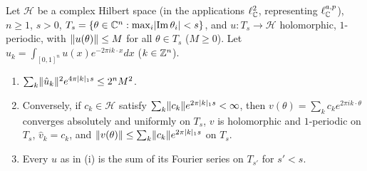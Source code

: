 \begin{lemma}\label{bpW:w1:fourier-l2}
Let $\mathcal H$ be a complex Hilbert space (in the applications $\ell^2_{\mathbb{C}}$, representing $\ell^{a,p}_{\mathbb{C}}$), $n\ge1$,
$s>0$, $T_s=\{\theta\in\mathbb{C}^n:\max_i\lvert \operatorname{Im}\theta_i\rvert<s\}$, and $u:T_s\to\mathcal H$ holomorphic, $1$-periodic,
with $\lVert u(\theta)\rVert\le M$ for all $\theta\in T_s$ ($M\ge0$). Let $\hat u_k=\int_{[0,1]^n}u(x)e^{-2\pi ik\cdot x}dx$ ($k\in\mathbb{Z}^n$).
\begin{enumerate}[label=(\roman*)]
\item $\sum_k\lVert \hat u_k\rVert^2e^{4\pi\lvert k\rvert_1s}\le2^nM^2$.
\item Conversely, if $c_k\in\mathcal H$ satisfy $\sum_k\lVert c_k\rVert e^{2\pi\lvert k\rvert_1s}<\infty$, then
  $v(\theta)=\sum_kc_ke^{2\pi ik\cdot\theta}$ converges absolutely and uniformly on $T_s$, $v$ is holomorphic and
  $1$-periodic on $T_s$, $\hat v_k=c_k$, and $\lVert v(\theta)\rVert\le\sum_k\lVert c_k\rVert e^{2\pi\lvert k\rvert_1s}$ on $T_s$.
\item Every $u$ as in (i) is the sum of its Fourier series on $T_{s'}$ for $s'<s$.
\end{enumerate}
\end{lemma}

